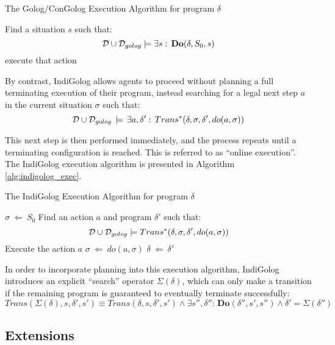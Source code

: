 %
\begin{algorithm}
\caption{The Golog/ConGolog Execution Algorithm for program $\delta$}


\label{alg:golog_exec} \begin{algorithmic} \STATE Find a situation
$s$ such that:\[
\mathcal{D}\cup\mathcal{D}_{golog}\models\exists s:\,\mathbf{Do}(\delta,S_{0},s)\]
  \STATE execute
that action \ENDFOR \end{algorithmic} 
\end{algorithm}


By contrast, IndiGolog allows agents to proceed without planning a
full terminating execution of their program, instead searching for
a legal next step $a$ in the current situation $\sigma$ such that:\[
\mathcal{D}\cup\mathcal{D}_{golog}\,\models\,\exists a,\delta':\, Trans^{*}(\delta,\sigma,\delta',do(a,\sigma))\]


This next step is then performed immediately, and the process repeats
until a terminating configuration is reached. This is referred to
as {}``online execution''. The IndiGolog execution algorithm is
presented in Algorithm \ref{alg:indigolog_exec}.

%
\begin{algorithm}
\caption{The IndiGolog Execution Algorithm for program $\delta$}


\label{alg:indigolog_exec} \begin{algorithmic} \STATE $\sigma\ \Leftarrow\ S_{0}$
 \STATE
Find an action $a$ and program $\delta'$ such that: \[
\mathcal{D}\cup\mathcal{D}_{golog}\models Trans^{*}(\delta,\sigma,\delta',do(a,\sigma))\]
 \STATE Execute the action $a$ \STATE $\sigma\ \Leftarrow\ do(a,\sigma)$
\STATE $\delta\ \Leftarrow\ \delta'$ \ENDWHILE \end{algorithmic} 
\end{algorithm}


In order to incorporate planning into this execution algorithm, IndiGolog
introduces an explicit {}``search'' operator $\Sigma(\delta)$,
which can only make a transition if the remaining program is guaranteed
to eventually terminate successfully:\[
Trans(\Sigma(\delta),s,\delta',s')\equiv Trans(\delta,s,\delta',s')\wedge\exists s'',\delta'':\,\mathbf{Do}(\delta'',s',s'') \wedge \delta'=\Sigma(\delta'')\]



\subsection{Extensions}

